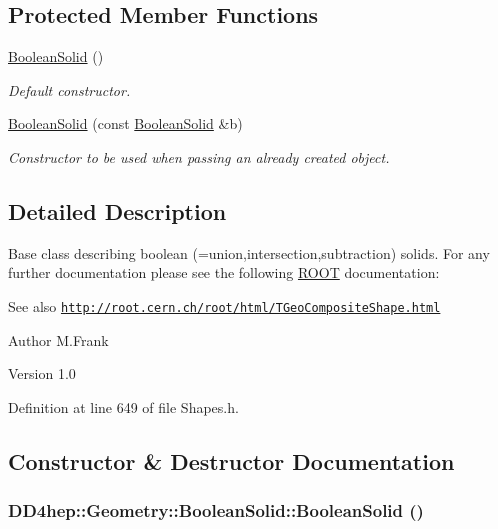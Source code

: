 \subsection*{Protected Member Functions}
\begin{DoxyCompactItemize}
\item 
\hyperlink{class_d_d4hep_1_1_geometry_1_1_boolean_solid_a16daae6253c20e965cd39d8a8e1ed388}{BooleanSolid} ()
\begin{DoxyCompactList}\small\item\em Default constructor. \item\end{DoxyCompactList}\item 
\hyperlink{class_d_d4hep_1_1_geometry_1_1_boolean_solid_a6a37b0a3bb546640df42f3cfa9cb3680}{BooleanSolid} (const \hyperlink{class_d_d4hep_1_1_geometry_1_1_boolean_solid}{BooleanSolid} \&b)
\begin{DoxyCompactList}\small\item\em Constructor to be used when passing an already created object. \item\end{DoxyCompactList}\end{DoxyCompactItemize}


\subsection{Detailed Description}
Base class describing boolean (=union,intersection,subtraction) solids. For any further documentation please see the following \hyperlink{namespace_r_o_o_t}{ROOT} documentation: \begin{DoxySeeAlso}{See also}
\href{http://root.cern.ch/root/html/TGeoCompositeShape.html}{\tt http://root.cern.ch/root/html/TGeoCompositeShape.html}
\end{DoxySeeAlso}
\begin{DoxyAuthor}{Author}
M.Frank 
\end{DoxyAuthor}
\begin{DoxyVersion}{Version}
1.0 
\end{DoxyVersion}


Definition at line 649 of file Shapes.h.

\subsection{Constructor \& Destructor Documentation}
\hypertarget{class_d_d4hep_1_1_geometry_1_1_boolean_solid_a16daae6253c20e965cd39d8a8e1ed388}{
\subsubsection[{BooleanSolid}]{\setlength{\rightskip}{0pt plus 5cm}DD4hep::Geometry::BooleanSolid::BooleanSolid ()}}
\label{class_d_d4hep_1_1_geometry_1_1_boolean_solid_a16daae6253c20e965cd39d8a8e1ed388}


